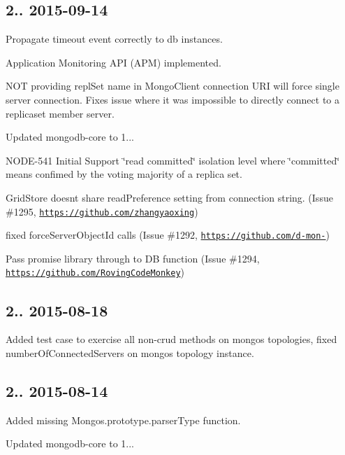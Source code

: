 \subsection*{2.. 2015-\/09-\/14 }


\begin{DoxyItemize}
\item Propagate timeout event correctly to db instances.
\item Application Monitoring A\+PI (A\+PM) implemented.
\item N\+OT providing repl\+Set name in Mongo\+Client connection U\+RI will force single server connection. Fixes issue where it was impossible to directly connect to a replicaset member server.
\item Updated mongodb-\/core to 1...
\item N\+O\+D\+E-\/541 Initial Support \char`\"{}read committed\char`\"{} isolation level where \char`\"{}committed\char`\"{} means confimed by the voting majority of a replica set.
\item Grid\+Store doesn\textquotesingle{}t share read\+Preference setting from connection string. (Issue \#1295, \href{https://github.com/zhangyaoxing}{\tt https\+://github.\+com/zhangyaoxing})
\item fixed force\+Server\+Object\+Id calls (Issue \#1292, \href{https://github.com/d-mon-}{\tt https\+://github.\+com/d-\/mon-\/})
\item Pass promise library through to DB function (Issue \#1294, \href{https://github.com/RovingCodeMonkey}{\tt https\+://github.\+com/\+Roving\+Code\+Monkey})
\end{DoxyItemize}

\subsection*{2.. 2015-\/08-\/18 }


\begin{DoxyItemize}
\item Added test case to exercise all non-\/crud methods on mongos topologies, fixed number\+Of\+Connected\+Servers on mongos topology instance.
\end{DoxyItemize}

\subsection*{2.. 2015-\/08-\/14 }


\begin{DoxyItemize}
\item Added missing Mongos.\+prototype.\+parser\+Type function.
\item Updated mongodb-\/core to 1...
\end{DoxyItemize}

